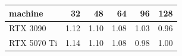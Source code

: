\begin{tabular}{lrrrrr}
\toprule
machine & 32 & 48 & 64 & 96 & 128 \\
\midrule
RTX 3090 & 1.12 & 1.10 & 1.08 & 1.03 & 0.96 \\
RTX 5070 Ti & 1.14 & 1.10 & 1.08 & 0.98 & 1.00 \\
\bottomrule
\end{tabular}
